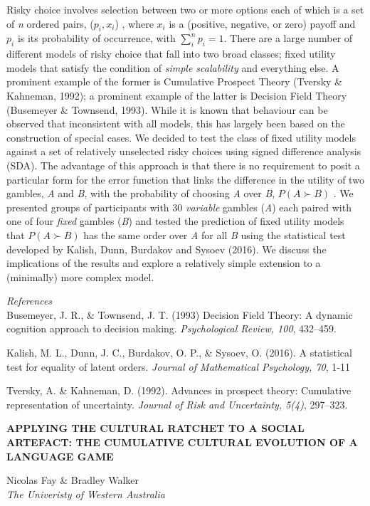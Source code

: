 \documentclass[]{article}
\begin{document}
Risky choice involves selection between two or more options each of
which is a set of \emph{n} ordered pairs, (\(p_i,x_i\)) , where \(x_i\)
is a (positive, negative, or zero) payoff and \(p_i\) is its probability
of occurrence, with \(\sum_i^n p_i=1\). There are a large number of
different models of risky choice that fall into two broad classes; fixed
utility models that satisfy the condition of \emph{simple scalability}
and everything else. A prominent example of the former is Cumulative
Prospect Theory (Tversky \& Kahneman, 1992); a prominent example of the
latter is Decision Field Theory (Busemeyer \& Townsend, 1993). While it
is known that behaviour can be observed that inconsistent with all
models, this has largely been based on the construction of special
cases. We decided to test the class of fixed utility models against a
set of relatively unselected risky choices using signed difference
analysis (SDA). The advantage of this approach is that there is no
requirement to posit a particular form for the error function that links
the difference in the utility of two gambles, \emph{A} and \emph{B},
with the probability of choosing \emph{A} over \emph{B},
\(P(A \succ B)\) . We presented groups of participants with 30
\emph{variable} gambles (\emph{A}) each paired with one of four
\emph{fixed} gambles (\emph{B}) and tested the prediction of fixed
utility models that \(P(A \succ B)\) has the same order over \emph{A}
for all \emph{B} using the statistical test developed by Kalish, Dunn,
Burdakov and Sysoev (2016). We discuss the implications of the results
and explore a relatively simple extension to a (minimally) more complex
model.

\emph{References}\\
Busemeyer, J. R., \& Townsend, J. T. (1993) Decision Field Theory: A
dynamic cognition approach to decision making. \emph{Psychological
Review, 100}, 432--459.

Kalish, M. L., Dunn, J. C., Burdakov, O. P., \& Sysoev, O. (2016). A
statistical test for equality of latent orders. \emph{Journal of
Mathematical Psychology, 70}, 1-11

Tversky, A. \& Kahneman, D. (1992). Advances in prospect theory:
Cumulative representation of uncertainty. \emph{Journal of Risk and
Uncertainty, 5(4)}, 297--323.\\
\pagebreak  

\textbf{APPLYING THE CULTURAL RATCHET TO A SOCIAL ARTEFACT: THE
CUMULATIVE CULTURAL EVOLUTION OF A LANGUAGE GAME}

Nicolas Fay \& Bradley Walker\\
\emph{The Univeristy of Western Australia}
\end{document}
